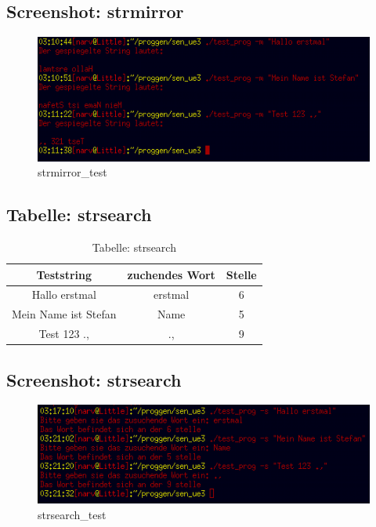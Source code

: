 \documentclass{scrartcl}
\begin{document}
\subsection{Screenshot: strmirror}
\begin{figure}[H]
  \centering
  \includegraphics[width=0.9\linewidth]{images/strmirror_test.png}
  \caption{strmirror\_test}
  \label{fig:digraph}
\end{figure}

\newpage
\subsection{Tabelle: strsearch}
\begin{table}[H]
  \centering
  \begin{tabular}{|c|c|c|}
    \hline
    Teststring & zuchendes Wort & Stelle \\
    \hline
    Hallo erstmal & erstmal & 6 \\
    \hline
    Mein Name ist Stefan & Name & 5 \\
    \hline
    Test 123 ., & ., & 9 \\
    \hline
  \end{tabular}
  \caption{Tabelle: strsearch}
\end{table}
\subsection{Screenshot: strsearch}
\begin{figure}[H]
  \centering
  \includegraphics[width=0.9\linewidth]{images/strsearch_test.png}
  \caption{strsearch\_test}
  \label{fig:digraph}
\end{figure}
\end{document}
